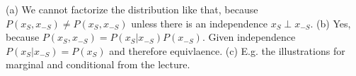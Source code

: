 (a) We cannot factorize the distribution like that, because $P(x_S, x_{-S}) \neq P(x_S, x_{-S})$ unless there is an independence $x_S \perp x_{-S}$.
(b) Yes, because $P(x_S, x_{-S}) = P(x_S|x_{-S})P(x_{-S})$. Given independence $P(x_S|x_{-S}) = P(x_S)$ and therefore equivlaence.
(c) E.g. the illustrations for marginal and conditional from the lecture.